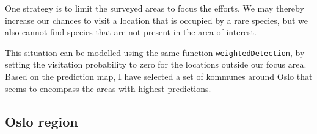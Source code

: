 \documentclass[]{article}
\begin{document}
One strategy is to limit the surveyed areas to focus the efforts. We may
thereby increase our chances to visit a location that is occupied by a
rare species, but we also cannot find species that are not present in
the area of interest.

This situation can be modelled using the same function
\texttt{weightedDetection}, by setting the visitation probability to
zero for the locations outside our focus area. Based on the prediction
map, I have selected a set of kommunes around Oslo that seems to
encompass the areas with highest predictions.

\subsection{Oslo region}\label{oslo-region}
\end{document}

